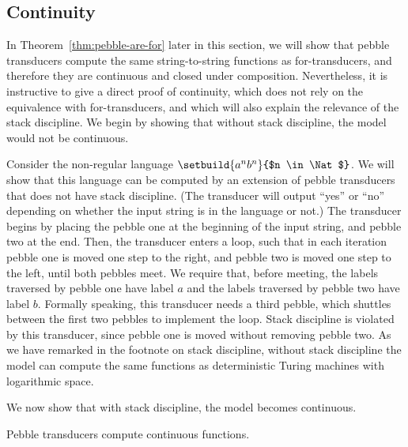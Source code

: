 \subsection{Continuity}
\label{sec:continuity-pebble}
In Theorem~\ref{thm:pebble-are-for} later in this section, we will show that pebble transducers compute the same string-to-string functions as for-transducers, and therefore they are continuous and closed under composition. Nevertheless, it is instructive to give a direct proof of continuity, which does not rely on the equivalence with for-transducers, and which will also explain the relevance of the stack discipline. We begin by showing that without stack discipline, the model would not be continuous.

\begin{myexample}
    \label{ex:importance-of-stack-discipline}
    Consider the non-regular language $\setbuild{a^n b^n}{$n \in \Nat$}$. We will show that this language can be computed by an extension of pebble transducers that does not have stack discipline. (The transducer will output ``yes'' or ``no'' depending on whether the input string is in the language or not.) The transducer begins by placing the pebble one at the beginning of the input string, and pebble two at the end. Then, the transducer enters a loop, such that in each iteration pebble one is moved one step to the right, and pebble two is moved one step to the left, until both pebbles meet. We require that, before meeting, the labels traversed by pebble one have label $a$ and the labels traversed by pebble two have label $b$. Formally speaking, this transducer needs a third pebble, which shuttles between the first two pebbles to implement the loop. Stack discipline is violated by this transducer, since pebble one is moved without removing pebble two.  As we have remarked in the footnote on stack discipline, without stack discipline the model can compute the same functions as deterministic Turing machines with logarithmic space.
\end{myexample}


We now show that with stack discipline, the model becomes continuous.

\begin{theorem}
    \label{thm:pebble-are-continuous}
    Pebble transducers compute continuous functions.
\end{theorem}

